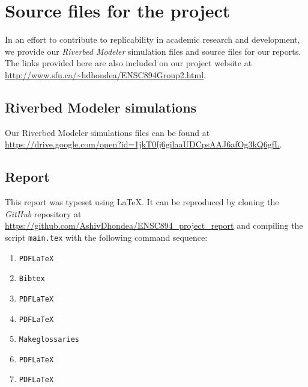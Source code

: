 \chapter{Source files for the project} \label{appendix:a}

In an effort to contribute to replicability in academic research and development, we provide our \textit{Riverbed Modeler} simulation files and source files for our reports. The links provided here are also included on our project website at \url{http://www.sfu.ca/~hdhondea/ENSC894Group2.html}.

\section{Riverbed Modeler simulations}
Our Riverbed Modeler simulations files can be found at \url{https://drive.google.com/open?id=1jkT0fj6gilaaUDCpsAAJ6afOg3kQ6gfL}.

\section{Report}
This report was typeset using \LaTeX. It can be reproduced by cloning the \textit{GitHub} repository at \url{https://github.com/AshivDhondea/ENSC894_project_report} and compiling the script \verb|main.tex| with the following command sequence:
\begin{enumerate}
	\item \verb|PDFLaTeX|
	\item \verb|Bibtex|
	\item \verb|PDFLaTeX|
	\item \verb|PDFLaTeX|
	\item \verb|Makeglossaries|
	\item \verb|PDFLaTeX|
	\item \verb|PDFLaTeX|
\end{enumerate}

